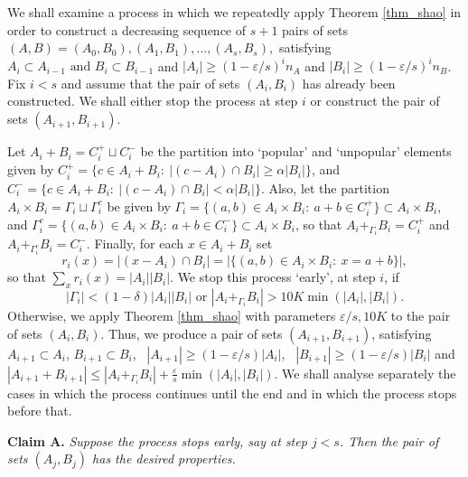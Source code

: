 \documentclass[12pt,reqno]{amsart}
\theoremstyle{definition}
\renewcommand\leq{\leqslant}
\renewcommand\geq{\geqslant}
\begin{document}
We shall examine a process in which we repeatedly apply Theorem \ref{thm_shao} in order to construct a decreasing sequence of $s+1$ pairs of sets $(A,B)=(A_0,B_0),(A_1,B_1), \hdots ,(A_s,B_s),$
satisfying $A_i \subset A_{i-1} \text{ and } B_i \subset B_{i-1}$ and
$|A_i|\geq (1-\varepsilon/s)^i n_A$ and  $|B_i|\geq (1-\varepsilon/s)^i n_B $.
Fix $i<s$ and assume that the pair of sets $(A_i,B_i)$ has already been
constructed. We shall either stop the process at step $i$ or construct the pair of
sets $(A_{i+1},B_{i+1})$.

Let $A_i+B_i=C_i^+\sqcup C_i^-$ be the partition into `popular'  and `unpopular' elements  given by $ C_i^+=\{c \in A_i+B_i: \
|(c-A_i)\cap B_i| \geq \alpha |B_i|\}$, and
$C_i^-=\{c \in A_i+B_i: \ |(c-A_i)\cap B_i| < \alpha |B_i|\}$.
Also, let the partition $A_i \times B_i=\Gamma_i\sqcup \Gamma_i^c$ be given by $\Gamma_i=\{(a,b) \in A_i \times
B_i: \ a+b \in C_i^+  \} \subset A_i \times B_i$, and $\Gamma_i^c=\{(a,b) \in A_i
\times B_i : \ a+b \in C_i^-  \} \subset A_i \times B_i$,
so that $A_i+_{\Gamma_i}B_i=C_i^+$  and  $A_i+_{\Gamma^c_i}B_i=C_i^-$.
Finally, for
each $x \in A_i+B_i$ set
\[
r_i(x)=|(x-A_i)\cap B_i|=|\{(a,b)\in A_i \times B_i: \
x=a+b\}|,
\]
so that $ \sum_x r_i(x)=|A_i||B_i|.$
We stop this process `early', at step $i$, if $$|\Gamma_i|<(1-\delta)|A_i||B_i| \text{ or } |A_i+_{\Gamma_i}B_i|> 10K \min(|A_i|,|B_i|).$$
Otherwise, we apply Theorem \ref{thm_shao} with parameters
$\varepsilon/s, 10K$ to the pair of sets $(A_i,B_i)$.  Thus, we produce a pair of sets $(A_{i+1},B_{i+1})$, satisfying
$A_{i+1} \subset A_i$,  $B_{i+1} \subset B_i$, \
$|A_{i+1}| \geq (1-\varepsilon/s)|A_i|$, \  $|B_{i+1}|\geq (1-\varepsilon/s)|B_i|$
and $|A_{i+1}+B_{i+1}| \leq |A_i+_{\Gamma_i}B_i|+\frac{\varepsilon}{s} \min(|A_i|,|B_i|)$.
We shall analyse separately the cases in which the process continues until the end and in
which the process stops before that.

\vspace{7pt}
{\bf Claim A.}
{\em
Suppose the process
stops early, say at step $j<s$. Then the pair of sets $(A_j,B_j)$ has the desired properties.
}
\end{document}
